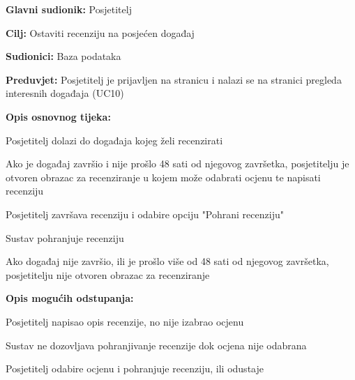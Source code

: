 					\noindent {}
\begin{packed_item}
	\item \textbf{Glavni sudionik:} Posjetitelj
	\item  \textbf{Cilj:} Ostaviti recenziju na posjećen događaj
	\item  \textbf{Sudionici:} Baza podataka
	\item  \textbf{Preduvjet:} Posjetitelj je prijavljen na stranicu i nalazi se na stranici pregleda interesnih događaja (UC10)
	\item  \textbf{Opis osnovnog tijeka:}
	
	\item[] \begin{packed_enum}
		
		\item Posjetitelj dolazi do događaja kojeg želi recenzirati
		\item Ako je događaj završio i nije prošlo 48 sati od njegovog završetka, posjetitelju je otvoren obrazac za recenziranje u kojem može odabrati ocjenu te napisati recenziju
		\item Posjetitelj završava recenziju i odabire opciju "Pohrani recenziju"
		\item Sustav pohranjuje recenziju
		\item Ako događaj nije završio, ili je prošlo više od 48 sati od njegovog završetka, posjetitelju nije otvoren obrazac za recenziranje

	\end{packed_enum}
	
			\item  \textbf{Opis mogućih odstupanja:}
			
	\item[] \begin{packed_item}
		\item[2.a] Posjetitelj napisao opis recenzije, no nije izabrao ocjenu
			\item[] \begin{packed_enum}
		\item Sustav ne dozovljava pohranjivanje recenzije dok ocjena nije odabrana
		\item Posjetitelj odabire ocjenu i pohranjuje recenziju, ili odustaje
		
	\end{packed_enum}
\end{packed_item}
\end{packed_item}

